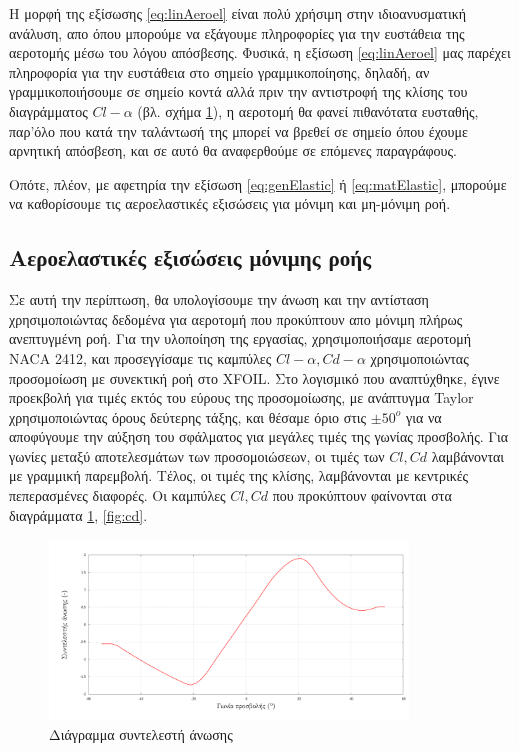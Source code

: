 Η μορφή της εξίσωσης \ref{eq:linAeroel} είναι πολύ χρήσιμη στην ιδιοανυσματική ανάλυση, απο όπου μπορούμε να εξάγουμε πληροφορίες για την ευστάθεια της αεροτομής μέσω του λόγου απόσβεσης. Φυσικά, η εξίσωση \ref{eq:linAeroel} μας παρέχει πληροφορία για την ευστάθεια στο σημείο γραμμικοποίησης, δηλαδή, αν γραμμικοποιήσουμε σε σημείο κοντά αλλά πριν την αντιστροφή της κλίσης του διαγράμματος $Cl-\alpha$ (βλ. σχήμα \ref{fig:cl}), η αεροτομή θα φανεί πιθανότατα ευσταθής, παρ'όλο που κατά την ταλάντωσή της μπορεί να βρεθεί σε σημείο όπου έχουμε αρνητική απόσβεση, και σε αυτό θα αναφερθούμε σε επόμενες παραγράφους.

Οπότε, πλέον, με αφετηρία την εξίσωση \ref{eq:genElastic} ή \ref{eq:matElastic}, μπορούμε να καθορίσουμε τις αεροελαστικές εξισώσεις για μόνιμη και μη-μόνιμη ροή.

\subsection{Αεροελαστικές εξισώσεις μόνιμης ροής}

Σε αυτή την περίπτωση, θα υπολογίσουμε την άνωση και την αντίσταση χρησιμοποιώντας δεδομένα για αεροτομή που προκύπτουν απο μόνιμη πλήρως ανεπτυγμένη ροή. Για την υλοποίηση της εργασίας, χρησιμοποιήσαμε αεροτομή NACA 2412, και προσεγγίσαμε τις  καμπύλες $Cl-\alpha, Cd-\alpha$ χρησιμοποιώντας προσομοίωση με συνεκτική ροή στο XFOIL. Στο λογισμικό που αναπτύχθηκε, έγινε προεκβολή για τιμές εκτός του εύρους της προσομοίωσης, με ανάπτυγμα Taylor χρησιμοποιώντας όρους δεύτερης τάξης, και θέσαμε όριο στις $\pm50^o$ για να αποφύγουμε την αύξηση του σφάλματος για μεγάλες τιμές της γωνίας προσβολής. Για γωνίες μεταξύ αποτελεσμάτων των προσομοιώσεων, οι τιμές των $Cl, Cd$ λαμβάνονται με γραμμική παρεμβολή. Τέλος, οι τιμές της κλίσης, λαμβάνονται με κεντρικές πεπερασμένες διαφορές. Οι καμπύλες $Cl, Cd$ που προκύπτουν φαίνονται στα διαγράμματα \ref{fig:cl}, \ref{fig:cd}.

\begin{figure}[ht!]
    \begin{center}
        \includegraphics[width=0.85\textwidth]{figures/cl.pdf}
    \end{center}
    \caption{Διάγραμμα συντελεστή άνωσης}
    \label{fig:cl}
\end{figure}

